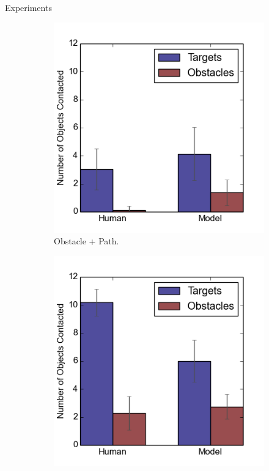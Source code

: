 \documentclass[final]{beamer}
\begin{document}
\begin{frame}{}
\begin{textblock}{37}
\begin{block}{Experiments}
\begin{figure}[h]
\begin{subfigure}[b]{0.24\textwidth}
\includegraphics[width=\textwidth]{contact2.png}
\caption{Obstacle + Path. }
\end{subfigure}
\begin{subfigure}[b]{0.24\textwidth}
\includegraphics[width=\textwidth]{contact3.png}

\end{subfigure}
\end{figure}
\end{block}
\end{textblock}
\end{frame}
\end{document}
